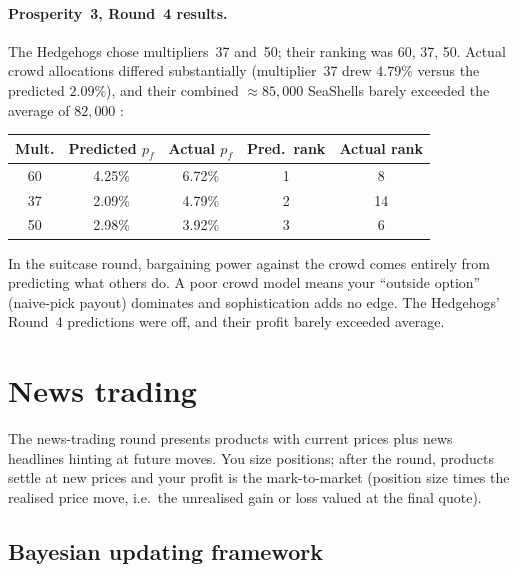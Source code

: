 \paragraph{Prosperity~3, Round~4 results.}
The Hedgehogs chose multipliers~37 and~50; their ranking was
60, 37, 50.  Actual crowd allocations differed substantially
(multiplier~37 drew $4.79\%$ versus the predicted $2.09\%$), and
their combined $\approx 85{,}000$ SeaShells barely exceeded the
average of $82{,}000$ \citep{frankfurtHedgehogs2025imcP3}:

\medskip
\begin{center}
\begin{tabular}{c c c c c}
\toprule
\textbf{Mult.} & \textbf{Predicted $p_f$} & \textbf{Actual $p_f$} & \textbf{Pred.\ rank} & \textbf{Actual rank} \\
\midrule
60 & 4.25\% & 6.72\% & 1 & 8 \\
37 & 2.09\% & 4.79\% & 2 & 14 \\
50 & 2.98\% & 3.92\% & 3 & 6 \\
\bottomrule
\end{tabular}
\end{center}
\medskip

\begin{intuitionbox}
In the suitcase round, bargaining power against the crowd comes
entirely from predicting what others do.  A poor crowd model
means your ``outside option'' (naive-pick payout) dominates and
sophistication adds no edge.  The Hedgehogs' Round~4 predictions
were off, and their profit barely exceeded average.
\end{intuitionbox}


\section{News trading}
\label{sec:ch25_news_trading}

The news-trading round presents products with current prices
plus news headlines hinting at future moves.  You size positions;
after the round, products settle at new prices and your profit
is the mark-to-market (position size times the realised price
move, i.e.\ the unrealised gain or loss valued at the final
quote).

\subsection{Bayesian updating framework}

